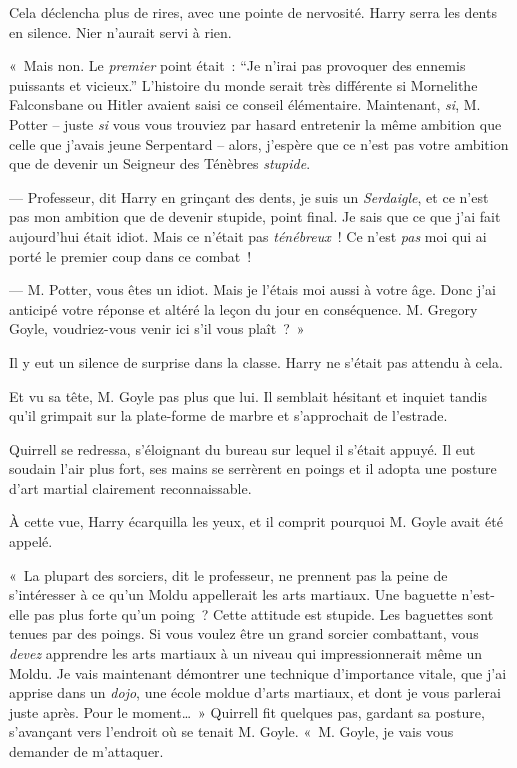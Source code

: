 Cela déclencha plus de rires, avec une pointe de nervosité.
Harry serra les dents en silence.
Nier n'aurait servi à rien.

«~Mais non.
Le \emph{premier} point était~: “Je n'irai pas provoquer des ennemis puissants et vicieux.” L'histoire du monde serait très différente si Mornelithe Falconsbane ou Hitler avaient saisi ce conseil élémentaire.
Maintenant, \emph{si}, M. Potter -- juste \emph{si} vous vous trouviez par hasard entretenir la même ambition que celle que j'avais jeune Serpentard -- alors, j'espère que ce n'est pas votre ambition que de devenir un Seigneur des Ténèbres \emph{stupide}.

--- Professeur, dit Harry en grinçant des dents, je suis un \emph{Serdaigle}, et ce n'est pas mon ambition que de devenir stupide, point final.
Je sais que ce que j'ai fait aujourd'hui était idiot.
Mais ce n'était pas \emph{ténébreux}~!
Ce n'est \emph{pas} moi qui ai porté le premier coup dans ce combat~!

--- M. Potter, vous êtes un idiot.
Mais je l'étais moi aussi à votre âge.
Donc j'ai anticipé votre réponse et altéré la leçon du jour en conséquence.
M. Gregory Goyle, voudriez-vous venir ici s'il vous plaît~?~»

Il y eut un silence de surprise dans la classe.
Harry ne s'était pas attendu à cela.

Et vu sa tête, M. Goyle pas plus que lui.
Il semblait hésitant et inquiet tandis qu'il grimpait sur la plate-forme de marbre et s'approchait de l'estrade.

Quirrell se redressa, s'éloignant du bureau sur lequel il s'était appuyé.
Il eut soudain l'air plus fort, ses mains se serrèrent en poings et il adopta une posture d'art martial clairement reconnaissable.

À cette vue, Harry écarquilla les yeux, et il comprit pourquoi M. Goyle avait été appelé.

«~La plupart des sorciers, dit le professeur, ne prennent pas la peine de s'intéresser à ce qu'un Moldu appellerait les arts martiaux.
Une baguette n'est-elle pas plus forte qu'un poing~?
Cette attitude est stupide.
Les baguettes sont tenues par des poings.
Si vous voulez être un grand sorcier combattant, vous \emph{devez} apprendre les arts martiaux à un niveau qui impressionnerait même un Moldu.
Je vais maintenant démontrer une technique d'importance vitale, que j'ai apprise dans un \emph{dojo}, une école moldue d'arts martiaux, et dont je vous parlerai juste après.
Pour le moment…~»
Quirrell fit quelques pas, gardant sa posture, s'avançant vers l'endroit où se tenait M. Goyle.
«~M. Goyle, je vais vous demander de m'attaquer.

